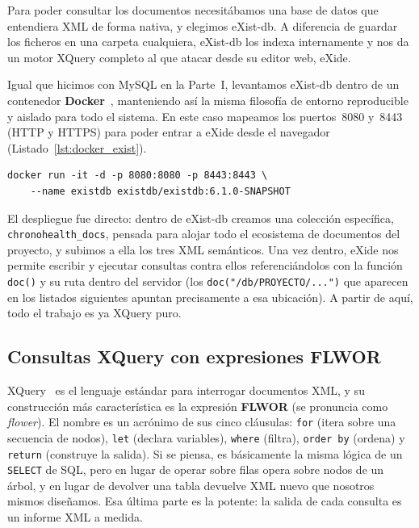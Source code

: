 \documentclass[../main.tex]{subfiles}
\begin{document}
Para poder consultar los documentos necesitábamos una base de datos que entendiera XML de forma nativa, y elegimos eXist-db. A diferencia de guardar los ficheros en una carpeta cualquiera, eXist-db los indexa internamente y nos da un motor XQuery completo al que atacar desde su editor web, eXide.

Igual que hicimos con MySQL en la Parte~I, levantamos eXist-db dentro de un contenedor \textbf{Docker}~\cite{docker}, manteniendo así la misma filosofía de entorno reproducible y aislado para todo el sistema. En este caso mapeamos los puertos~8080 y~8443 (HTTP y HTTPS) para poder entrar a eXide desde el navegador (Listado~\ref{lst:docker_exist}).

\begin{lstlisting}[caption={Arranque de eXist-db en un contenedor Docker, exponiendo los puertos de eXide.}, label={lst:docker_exist}]
docker run -it -d -p 8080:8080 -p 8443:8443 \
    --name existdb existdb/existdb:6.1.0-SNAPSHOT
\end{lstlisting}

El despliegue fue directo: dentro de eXist-db creamos una colección específica, \texttt{chronohealth\_docs}, pensada para alojar todo el ecosistema de documentos del proyecto, y subimos a ella los tres XML semánticos. Una vez dentro, eXide nos permite escribir y ejecutar consultas contra ellos referenciándolos con la función \texttt{doc()} y su ruta dentro del servidor (los \texttt{doc("/db/PROYECTO/...")} que aparecen en los listados siguientes apuntan precisamente a esa ubicación). A partir de aquí, todo el trabajo es ya XQuery puro.

\subsection{Consultas XQuery con expresiones FLWOR}

XQuery~\cite{w3cxquery} es el lenguaje estándar para interrogar documentos XML, y su construcción más característica es la expresión \textbf{FLWOR} (se pronuncia como \textit{flower}). El nombre es un acrónimo de sus cinco cláusulas: \texttt{for} (itera sobre una secuencia de nodos), \texttt{let} (declara variables), \texttt{where} (filtra), \texttt{order by} (ordena) y \texttt{return} (construye la salida). Si se piensa, es básicamente la misma lógica de un \texttt{SELECT} de SQL, pero en lugar de operar sobre filas opera sobre nodos de un árbol, y en lugar de devolver una tabla devuelve XML nuevo que nosotros mismos diseñamos. Esa última parte es la potente: la salida de cada consulta es un informe XML a medida.
\end{document}
